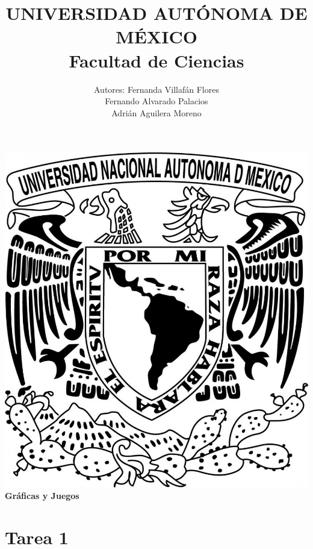 \documentclass{article}
\begin{document}
\title{UNIVERSIDAD AUTÓNOMA DE MÉXICO\\ Facultad de Ciencias}
\author{Autores:  Fernanda Villafán Flores
  \\ Fernando Alvarado Palacios
  \\ Adrián Aguilera Moreno}
\date{}
\maketitle
\begin{center}
  \includegraphics[scale=0.20]{../Imagen/Portada.jpg}\\[0.4cm]
  \Large
  \bf{Gráficas y Juegos}
  \normalsize
\end{center}
\newpage
{}
\section*{\LARGE{Tarea 1}}
\end{document}
